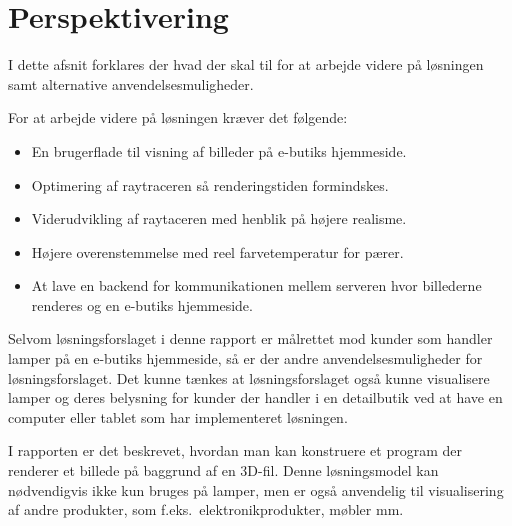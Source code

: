 \section{Perspektivering}
I dette afsnit forklares der hvad der skal til for at arbejde videre på løsningen samt alternative anvendelsesmuligheder. 

For at arbejde videre på løsningen kræver det følgende:

\begin{itemize}
\item En brugerflade til visning af billeder på e-butiks hjemmeside.
\item Optimering af raytraceren så renderingstiden formindskes. 
\item Viderudvikling af raytaceren med henblik på højere realisme.
\item Højere overenstemmelse med reel farvetemperatur for pærer.  
\item At lave en backend for kommunikationen mellem serveren hvor billederne renderes og en e-butiks hjemmeside.
\end{itemize}

Selvom løsningsforslaget i denne rapport er målrettet mod kunder som handler lamper på en e-butiks hjemmeside, så er der andre anvendelsesmuligheder for løsningsforslaget. Det kunne tænkes at løsningsforslaget også kunne visualisere lamper og deres belysning for kunder der handler i en detailbutik ved at have en computer eller tablet som har implementeret løsningen. 

I rapporten er det beskrevet, hvordan man kan konstruere et program der renderer et billede på baggrund af en 3D-fil. Denne løsningsmodel kan nødvendigvis ikke kun bruges på lamper, men er også anvendelig til visualisering af andre produkter, som f.eks.\ elektronikprodukter, møbler mm.\ 

\clearpage
